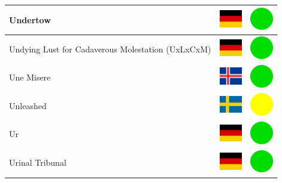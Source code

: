 \documentclass[12pt, a4paper, twoside]{report}
\begin{document}
\begin{center}
\begin{longtable}{|p{5cm}|p{2cm}|p{2cm}|}
Undertow & \includegraphics[width=1cm]{4x3/de} & \includegraphics[width=1cm]{likes/y} \\ \hline
Undying Lust for Cadaverous Molestation (UxLxCxM) & \includegraphics[width=1cm]{4x3/de} & \includegraphics[width=1cm]{likes/y} \\ \hline
Une Misere & \includegraphics[width=1cm]{4x3/is} & \includegraphics[width=1cm]{likes/y} \\ \hline
Unleashed & \includegraphics[width=1cm]{4x3/se} & \includegraphics[width=1cm]{likes/m} \\ \hline
Ur & \includegraphics[width=1cm]{4x3/de} & \includegraphics[width=1cm]{likes/y} \\ \hline
Urinal Tribunal & \includegraphics[width=1cm]{4x3/de} & \includegraphics[width=1cm]{likes/y} \\ \hline

\end{longtable}
\end{center}
\end{document}
